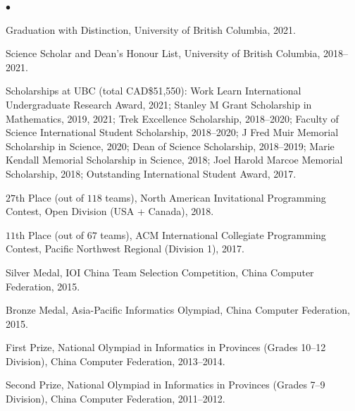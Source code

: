 \documentclass[margin,line]{res}
\newenvironment{list2}{
  \begin{list}{$\bullet$}{%
      \setlength{\itemsep}{0in}
      \setlength{\parsep}{0in} \setlength{\parskip}{0in}
      \setlength{\topsep}{0in} \setlength{\partopsep}{0in}
      \setlength{\leftmargin}{0.2in}}}{\end{list}}
\begin{document}
\begin{resume}
\begin{list2}
\item[$\circ$] Graduation with Distinction, University of British Columbia, 2021.
\item[$\circ$] Science Scholar and Dean's Honour List, University of British Columbia, 2018--2021.
\item[$\circ$] Scholarships at UBC (total CAD\$51,550): Work Learn International Undergraduate Research Award, 2021; Stanley M Grant Scholarship in Mathematics, 2019, 2021; Trek Excellence Scholarship, 2018--2020; Faculty of Science International Student Scholarship, 2018--2020; J Fred Muir Memorial Scholarship in Science, 2020; Dean of Science Scholarship, 2018--2019; Marie Kendall Memorial Scholarship in Science, 2018; Joel Harold Marcoe Memorial Scholarship, 2018; Outstanding International Student Award, 2017.
\item[$\circ$] $27$th Place (out of $118$ teams), North American Invitational Programming Contest, Open Division (USA + Canada), 2018.
\item[$\circ$] $11$th Place (out of $67$ teams), ACM International Collegiate Programming Contest, Pacific Northwest Regional (Division 1), 2017.
\item[$\circ$] Silver Medal, IOI China Team Selection Competition, China Computer Federation, 2015.
\item[$\circ$] Bronze Medal, Asia-Pacific Informatics Olympiad, China Computer Federation, 2015.
\item[$\circ$] First Prize, National Olympiad in Informatics in Provinces (Grades 10--12 Division), China Computer Federation, 2013--2014.
\item[$\circ$] Second Prize, National Olympiad in Informatics in Provinces (Grades 7--9 Division), China Computer Federation, 2011--2012.
\end{list2}



\end{resume}
\end{document}

